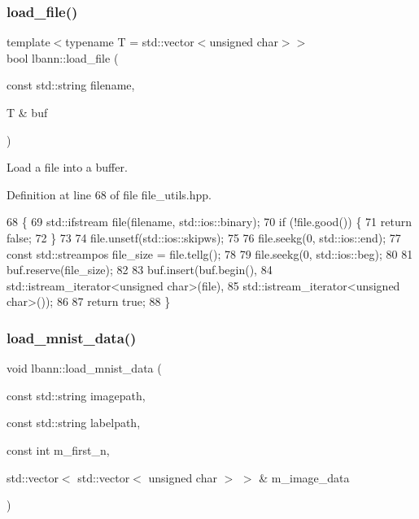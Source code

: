 \subsubsection{\texorpdfstring{load\+\_\+file()}{load\_file()}}
{\footnotesize\ttfamily template$<$typename T  = std\+::vector$<$unsigned char$>$$>$ \\
bool lbann\+::load\+\_\+file (\begin{DoxyParamCaption}\item[{const std\+::string}]{filename,  }\item[{T \&}]{buf }\end{DoxyParamCaption})\hspace{0.3cm}{\ttfamily [inline]}}



Load a file into a buffer. 



Definition at line 68 of file file\+\_\+utils.\+hpp.


\begin{DoxyCode}
68                                                         \{
69   std::ifstream file(filename, std::ios::binary);
70   \textcolor{keywordflow}{if} (!file.good()) \{
71     \textcolor{keywordflow}{return} \textcolor{keyword}{false};
72   \}
73 
74   file.unsetf(std::ios::skipws);
75 
76   file.seekg(0, std::ios::end);
77   \textcolor{keyword}{const} std::streampos file\_size = file.tellg();
78 
79   file.seekg(0, std::ios::beg);
80 
81   buf.reserve(file\_size);
82 
83   buf.insert(buf.begin(),
84              std::istream\_iterator<unsigned char>(file),
85              std::istream\_iterator<unsigned char>());
86 
87   \textcolor{keywordflow}{return} \textcolor{keyword}{true};
88 \}
\end{DoxyCode}
\mbox{\label{namespacelbann_a59f65281406da5bc57f49d8ec682be2d}} 
\subsubsection{\texorpdfstring{load\+\_\+mnist\+\_\+data()}{load\_mnist\_data()}}
{\footnotesize\ttfamily void lbann\+::load\+\_\+mnist\+\_\+data (\begin{DoxyParamCaption}\item[{const std\+::string}]{imagepath,  }\item[{const std\+::string}]{labelpath,  }\item[{const int}]{m\+\_\+first\+\_\+n,  }\item[{std\+::vector$<$ std\+::vector$<$ unsigned char $>$ $>$ \&}]{m\+\_\+image\+\_\+data }\end{DoxyParamCaption})}



